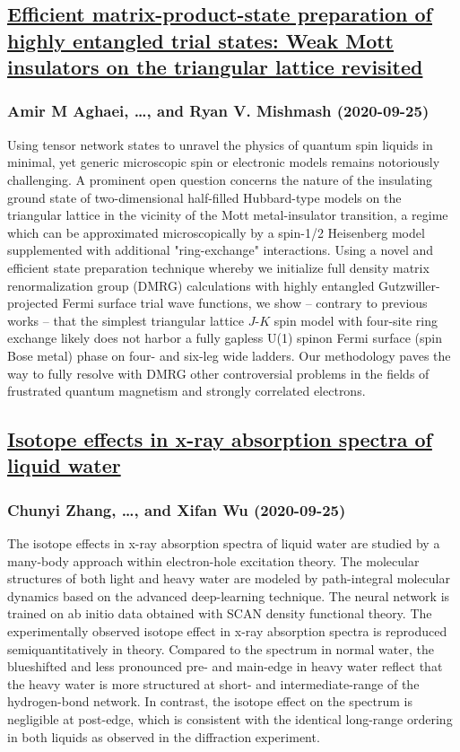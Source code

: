 \subsection*{\href{http://arxiv.org/abs/2009.12435v1}{Efficient matrix-product-state preparation of highly entangled trial  states: Weak Mott insulators on the triangular lattice revisited}}
\subsubsection*{Amir M Aghaei, \dots, and Ryan V. Mishmash (2020-09-25)}
Using tensor network states to unravel the physics of quantum spin liquids in
minimal, yet generic microscopic spin or electronic models remains notoriously
challenging. A prominent open question concerns the nature of the insulating
ground state of two-dimensional half-filled Hubbard-type models on the
triangular lattice in the vicinity of the Mott metal-insulator transition, a
regime which can be approximated microscopically by a spin-1/2 Heisenberg model
supplemented with additional "ring-exchange" interactions. Using a novel and
efficient state preparation technique whereby we initialize full density matrix
renormalization group (DMRG) calculations with highly entangled
Gutzwiller-projected Fermi surface trial wave functions, we show -- contrary to
previous works -- that the simplest triangular lattice $J$-$K$ spin model with
four-site ring exchange likely does not harbor a fully gapless U(1) spinon
Fermi surface (spin Bose metal) phase on four- and six-leg wide ladders. Our
methodology paves the way to fully resolve with DMRG other controversial
problems in the fields of frustrated quantum magnetism and strongly correlated
electrons.

\subsection*{\href{http://arxiv.org/abs/2009.12429v1}{Isotope effects in x-ray absorption spectra of liquid water}}
\subsubsection*{Chunyi Zhang, \dots, and Xifan Wu (2020-09-25)}
The isotope effects in x-ray absorption spectra of liquid water are studied
by a many-body approach within electron-hole excitation theory. The molecular
structures of both light and heavy water are modeled by path-integral molecular
dynamics based on the advanced deep-learning technique. The neural network is
trained on ab initio data obtained with SCAN density functional theory. The
experimentally observed isotope effect in x-ray absorption spectra is
reproduced semiquantitatively in theory. Compared to the spectrum in normal
water, the blueshifted and less pronounced pre- and main-edge in heavy water
reflect that the heavy water is more structured at short- and
intermediate-range of the hydrogen-bond network. In contrast, the isotope
effect on the spectrum is negligible at post-edge, which is consistent with the
identical long-range ordering in both liquids as observed in the diffraction
experiment.

